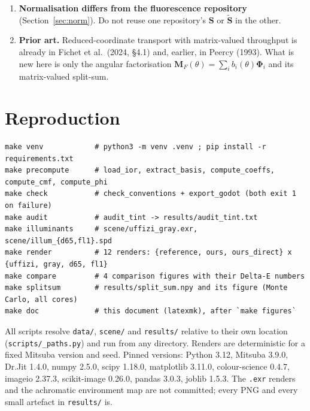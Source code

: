 \documentclass[11pt,a4paper]{article}
\newcommand{\mS}{\mathbf{S}}
\newcommand{\mSd}{\tilde{\mathbf{S}}}
\newcommand{\mPhi}{\boldsymbol{\Phi}}
\newcommand{\mM}{\mathbf{M}}
\newcommand{\file}[1]{\texttt{#1}}
\begin{document}
\begin{enumerate}
        table, read verbatim; its training corpus (99\% dielectrics, 1\%
        conductors) bounds its fidelity on exotic metals.
  \item \textbf{Normalisation differs from the fluorescence repository}
        (Section~\ref{sec:norm}).  Do not reuse one repository's $\mS$ or
        $\mSd$ in the other.
  \item \textbf{Prior art.}  Reduced-coordinate transport with matrix-valued
        throughput is already in Fichet et al.\ (2024, \S4.1) and, earlier, in
        Peercy (1993).  What is new here is only the angular factorisation
        $\mM_F(\theta)=\sum_ib_i(\theta)\mPhi_i$ and its matrix-valued
        split-sum.
\end{enumerate}

\section{Reproduction}
\label{sec:repro}

\begin{verbatim}
make venv            # python3 -m venv .venv ; pip install -r requirements.txt
make precompute      # load_ior, extract_basis, compute_coeffs, compute_cmf, compute_phi
make check           # check_conventions + export_godot (both exit 1 on failure)
make audit           # audit_tint -> results/audit_tint.txt
make illuminants     # scene/uffizi_gray.exr, scene/illum_{d65,fl1}.spd
make render          # 12 renders: {reference, ours, ours_direct} x {uffizi, gray, d65, fl1}
make compare         # 4 comparison figures with their Delta-E numbers
make splitsum        # results/split_sum.npy and its figure (Monte Carlo, all cores)
make doc             # this document (latexmk), after `make figures`
\end{verbatim}
All scripts resolve \file{data/}, \file{scene/} and \file{results/} relative
to their own location (\file{scripts/\_paths.py}) and run from any directory.
Renders are deterministic for a fixed Mitsuba version and seed.  Pinned
versions: Python 3.12, Mitsuba 3.9.0, Dr.Jit 1.4.0, numpy 2.5.0, scipy
1.18.0, matplotlib 3.11.0, colour-science 0.4.7, imageio 2.37.3, scikit-image
0.26.0, pandas 3.0.3, joblib 1.5.3.  The \file{.exr} renders and the
achromatic environment map are not committed; every PNG and every small
artefact in \file{results/} is.

\appendix
\end{document}
